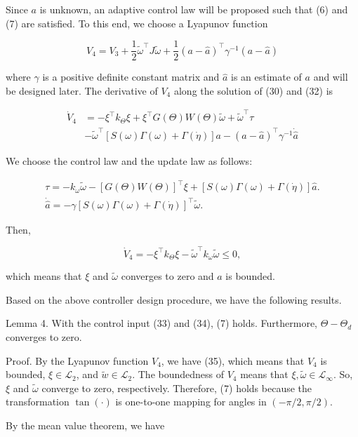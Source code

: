 \documentclass[10pt]{article}
\begin{document}
Since $a$ is unknown, an adaptive control law will be proposed such that (6) and (7) are satisfied. To this end, we choose a Lyapunov function

$$
V_{4}=V_{3}+\frac{1}{2} \tilde{\omega}^{\top} J \tilde{\omega}+\frac{1}{2}(a-\hat{a})^{\top} \gamma^{-1}(a-\hat{a})
$$

where $\gamma$ is a positive definite constant matrix and $\hat{a}$ is an estimate of $a$ and will be designed later. The derivative of $V_{4}$ along the solution of (30) and (32) is

$$
\begin{aligned}
\dot{V}_{4} & =-\xi^{\top} k_{\Theta} \xi+\xi^{\top} G(\Theta) W(\Theta) \tilde{\omega}+\tilde{\omega}^{\top} \tau \\
& -\tilde{\omega}^{\top}[S(\omega) \Gamma(\omega)+\Gamma(\dot{\eta})] a-(a-\hat{a})^{\top} \gamma^{-1} \dot{\hat{a}}
\end{aligned}
$$

We choose the control law and the update law as follows:

$$
\begin{gathered}
\tau=-k_{\omega} \tilde{\omega}-[G(\Theta) W(\Theta)]^{\top} \xi+[S(\omega) \Gamma(\omega)+\Gamma(\dot{\eta})] \hat{a} . \\
\dot{\hat{a}}=-\gamma[S(\omega) \Gamma(\omega)+\Gamma(\dot{\eta})]^{\top} \tilde{\omega} .
\end{gathered}
$$

Then,

$$
\dot{V}_{4}=-\xi^{\top} k_{\Theta} \xi-\tilde{\omega}^{\top} k_{\omega} \tilde{\omega} \leq 0,
$$

which means that $\xi$ and $\tilde{\omega}$ converges to zero and $\hat{a}$ is bounded.

Based on the above controller design procedure, we have the following results.

Lemma 4. With the control input (33) and (34), (7) holds. Furthermore, $\Theta-\Theta_{d}$ converges to zero.

Proof. By the Lyapunov function $V_{4}$, we have (35), which means that $V_{4}$ is bounded, $\xi \in \mathcal{L}_{2}$, and $\tilde{w} \in \mathcal{L}_{2}$. The boundedness of $V_{4}$ means that $\xi, \tilde{\omega} \in \mathcal{L}_{\infty}$. So, $\xi$ and $\tilde{\omega}$ converge to zero, respectively. Therefore, (7) holds because the transformation $\tan (\cdot)$ is one-to-one mapping for angles in $(-\pi / 2, \pi / 2)$.

By the mean value theorem, we have
\end{document}
